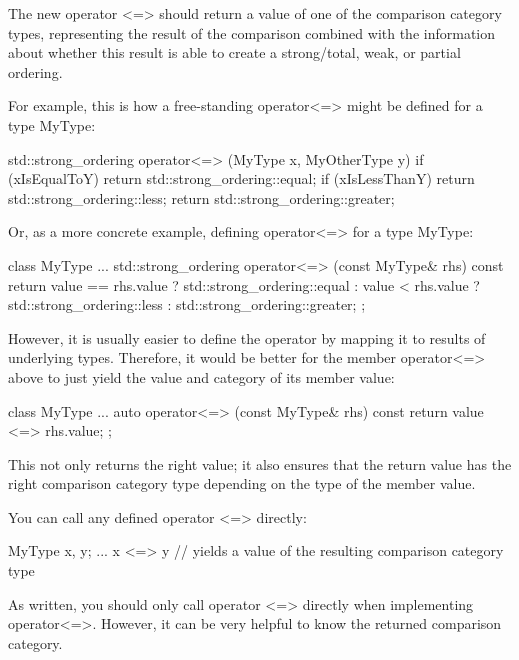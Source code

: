 
The new operator <=> should return a value of one of the comparison category types, representing the result of the comparison combined with the information about whether this result is able to create a strong/total, weak, or partial ordering.

For example, this is how a free-standing operator<=> might be defined for a type MyType:

\begin{cpp}
std::strong_ordering operator<=> (MyType x, MyOtherType y)
{
	if (xIsEqualToY) return std::strong_ordering::equal;
	if (xIsLessThanY) return std::strong_ordering::less;
	return std::strong_ordering::greater;
}
\end{cpp}

Or, as a more concrete example, defining operator<=> for a type MyType:

\begin{cpp}
class MyType {
	...
	std::strong_ordering operator<=> (const MyType& rhs) const {
		return value == rhs.value ? std::strong_ordering::equal :
			   value < rhs.value ? std::strong_ordering::less :
							       std::strong_ordering::greater;
	}
};
\end{cpp}

However, it is usually easier to define the operator by mapping it to results of underlying types. Therefore, it would be better for the member operator<=> above to just yield the value and category of its member value:

\begin{cpp}
class MyType {
	...
	auto operator<=> (const MyType& rhs) const {
		return value <=> rhs.value;
	}
};
\end{cpp}

This not only returns the right value; it also ensures that the return value has the right comparison category type depending on the type of the member value.


You can call any defined operator <=> directly:

\begin{cpp}
MyType x, y;
...
x <=> y // yields a value of the resulting comparison category type
\end{cpp}

As written, you should only call operator <=> directly when implementing operator<=>. However, it can be very helpful to know the returned comparison category.


